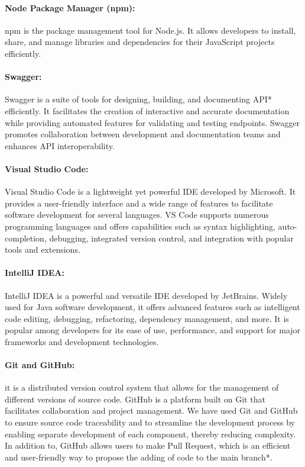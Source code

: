 \documentclass[12pt,a4paper,table,english]{article}
\begin{document}
	\paragraph{Node Package Manager (npm):} npm is the package management tool for Node.js. It allows developers to install, share, and manage libraries and dependencies for their JavaScript projects efficiently. 
	
	\paragraph{Swagger:} Swagger is a suite of tools for designing, building, and documenting API* efficiently. It facilitates the creation of interactive and accurate documentation while providing automated features for validating and testing endpoints. Swagger promotes collaboration between development and documentation teams and enhances API interoperability.
	
	
	\paragraph{Visual Studio Code:} Visual Studio Code is a lightweight yet powerful IDE developed by Microsoft. It provides a user-friendly interface and a wide range of features to facilitate software development for several languages. VS Code supports numerous programming languages and offers capabilities such as syntax highlighting, auto-completion, debugging, integrated version control, and integration with popular tools and extensions.
	
	\paragraph{IntelliJ IDEA:} IntelliJ IDEA is a powerful and versatile IDE developed by JetBrains. Widely used for Java software development, it offers advanced features such as intelligent code editing, debugging, refactoring, dependency management, and more. It is popular among developers for its ease of use, performance, and support for major frameworks and development technologies.
	
	
	\paragraph{Git and GitHub:} it is a distributed version control system that allows for the management of different versions of source code. GitHub is a platform built on Git that facilitates collaboration and project management. We have used Git and GitHub to ensure source code traceability and to streamline the development process by enabling separate development of each component, thereby reducing complexity. In addition to, GitHub allows users to make Pull Request, which is an efficient and user-friendly way to propose the adding of code to the main branch*. 
	
\end{document}

